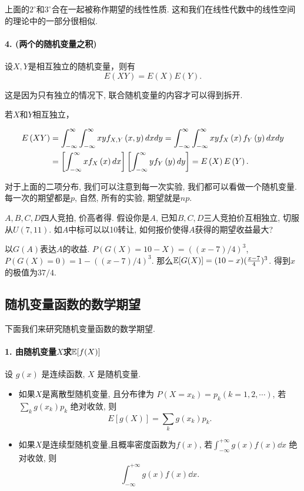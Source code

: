    上面的$2^\circ$和$3^\circ$合在一起被称作期望的线性性质. 这和我们在线性代数中的线性空间的理论中的一部分很相似. 

    \paragraph{4. (两个的随机变量之积)} 设$X,Y$是相互独立的随机变量，则有\[
        E\left(XY\right) = E\left(X\right)E\left(Y\right).
    \]



    这是因为只有独立的情况下, 联合随机变量的内容才可以得到拆开. 

    若$X$和$Y$相互独立，
        
        \begin{align}
            E\left(XY\right) &= \int_{-\infty}^{\infty}\int_{-\infty}^{\infty}xyf_{X,Y}\left(x,y\right){d}x{d}y = \int_{-\infty}^{\infty}\int_{-\infty}^{\infty}xyf_X\left(x\right)f_Y\left(y\right){d}x{d}y\notag\\
            & = \left[\int_{-\infty}^{\infty}xf_X\left(x\right){d}x\right]\left[\int_{-\infty}^{\infty}yf_Y\left(y\right){d}y\right] = E\left(X\right)E\left(Y\right).\notag
        \end{align}

    对于上面的二项分布, 我们可以注意到每一次实验, 我们都可以看做一个随机变量. 每一次的期望都是$p$, 自然, 所有的实验, 期望就是$np$. 

    \begin{exercise}
        $A, B, C, D$四人竞拍, 价高者得. 假设你是$A$, 已知$B, C, D$三人竞拍价互相独立, 切服从$U(7,11)$. 如$A$中标可以以10转让, 如何报价使得$A$获得的期望收益最大?
    \end{exercise}

    \begin{solution}
        以$G(A)$表达$A$的收益. $P(G(X)=10-X)=((x-7)/4)^3$, $P(G(X)=0)=1-((x-7)/4)^3$. 那么$\mathbb E[G(X)]=(10-x)(\frac{x-7} 4)^3$. 得到$x$的极值为$37/4$. 
    \end{solution}
    
    \subsection{随机变量函数的数学期望}
    下面我们来研究随机变量函数的数学期望. 

    \paragraph{1. 由随机变量$X$求$\mathbb E[f(X)]$} 设 $g(x)$ 是连续函数, $X$ 是随机变量.
    \begin{itemize}
        \item 如果$X$是离散型随机变量, 且分布律为 $P\left(X=x_k\right)=p_k(k=1,2, \cdots)$, 若 $\sum_k g\left(x_k\right) p_k$ 绝对收敛, 则
        $$
        E[g(X)]=\sum_k g\left(x_k\right) p_k .
        $$
        \item 如果$X$是连续型随机变量,且概率密度函数为$f(x)$, 若$\int_{-\infty}^{+\infty} g(x)f(x)\dd x$ 绝对收敛, 则
        $$\int_{-\infty}^{+\infty} g(x)f(x)\dd x.$$
    \end{itemize}
    
